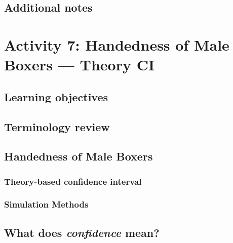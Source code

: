 \documentclass[
]{report}
\begin{document}
\hypertarget{additional-notes-10}{%
\subsection{Additional notes}\label{additional-notes-10}}

\hypertarget{activity-7-handedness-of-male-boxers-theory-ci}{%
\section{Activity 7: Handedness of Male Boxers --- Theory CI}\label{activity-7-handedness-of-male-boxers-theory-ci}}

\hypertarget{learning-objectives}{%
\subsection{Learning objectives}\label{learning-objectives}}

\hypertarget{terminology-review-11}{%
\subsection{Terminology review}\label{terminology-review-11}}

\hypertarget{handedness-of-male-boxers-1}{%
\subsection{Handedness of Male Boxers}\label{handedness-of-male-boxers-1}}

\hypertarget{theory-based-confidence-interval}{%
\subsubsection*{Theory-based confidence interval}\label{theory-based-confidence-interval}}

\hypertarget{simulation-methods}{%
\subsubsection*{Simulation Methods}\label{simulation-methods}}

\hypertarget{what-does-confidence-mean}{%
\subsection*{\texorpdfstring{What does \emph{confidence} mean?}{What does confidence mean?}}\label{what-does-confidence-mean}}
\end{document}
